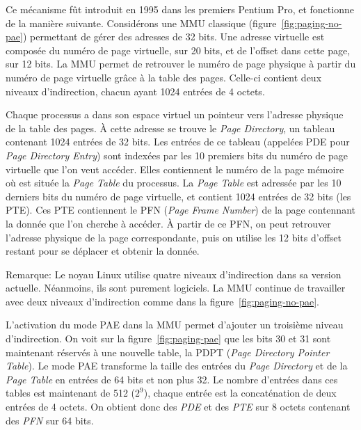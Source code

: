       Ce mécanisme fût introduit en 1995 dans les premiers Pentium Pro, et
      fonctionne de la manière suivante. Considérons une MMU classique
      (figure~\ref{fig:paging-no-pae}) permettant de gérer des adresses de 32
      bits. Une adresse virtuelle est composée du numéro de page virtuelle, sur
      20 bits, et de l'offset dans cette page, sur 12 bits. La MMU permet de
      retrouver le numéro de page physique à partir du numéro de page virtuelle
      grâce à la table des pages. Celle-ci contient deux niveaux d'indirection,
      chacun ayant 1024 entrées de 4 octets.

      Chaque processus a dans son espace virtuel un pointeur vers l'adresse
      physique de la table des pages. À cette adresse se trouve le \textit{Page
        Directory}, un tableau contenant 1024 entrées de 32 bits. Les entrées de
      ce tableau (appelées PDE pour
      \textit{Page Directory Entry}) sont indexées par les 10 premiers bits du
      numéro de page virtuelle que l'on veut accéder. Elles contiennent le
      numéro de la page mémoire où est située la \textit{Page Table} du
      processus. La \textit{Page Table} est adressée par les 10 derniers bits du
      numéro de page virtuelle, et contient 1024 entrées de 32 bits (les
      PTE). Ces PTE contiennent le
      PFN (\textit{Page Frame Number}) de
      la page contennant la donnée que l'on cherche à accéder. À partir de ce
      PFN, on peut retrouver l'adresse physique de la page correspondante, puis
      on utilise les 12 bits d'offset restant pour se déplacer et obtenir la
      donnée.

      \begin{paragraph}{Remarque:}
        Le noyau Linux utilise quatre niveaux d'indirection dans sa version
        actuelle. Néanmoins, ils sont purement logiciels. La MMU continue de
        travailler avec deux niveaux d'indirection comme dans la
        figure~\ref{fig:paging-no-pae}.\\
      \end{paragraph}
      
      L'activation du mode PAE dans la MMU permet d'ajouter un troisième niveau
      d'indirection. On voit sur la figure~\ref{fig:paging-pae} que les bits 30
      et 31 sont maintenant réservés à une nouvelle table, la
      PDPT (\textit{Page
        Directory Pointer Table}). Le mode PAE transforme la taille des entrées
      du \textit{Page Directory} et de la \textit{Page Table} en entrées de 64
      bits et non plus 32. Le nombre d'entrées dans ces tables est maintenant de
      512 ($2^{9}$), chaque entrée est la concaténation de deux entrées de 4
      octets. On obtient donc des \textit{PDE} et des \textit{PTE} sur 8 octets
      contenant des \textit{PFN} sur 64 bits.

